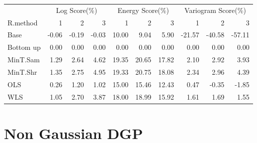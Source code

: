 \documentclass[]{article}
\begin{document}
\begin{table}[H]
\centering
\begin{tabular}{l|r|r|r|r|r|r|r|r|r}
\hline
\multicolumn{1}{c|}{ } & \multicolumn{3}{c|}{Log Score(\%)} & \multicolumn{3}{c|}{Energy Score(\%)} & \multicolumn{3}{c}{Variogram Score(\%)} \\
\cline{2-4} \cline{5-7} \cline{8-10}
R.method & 1 & 2 & 3 & 1 & 2 & 3 & 1 & 2 & 3\\
\hline
Base & -0.06 & -0.19 & -0.03 & 10.00 & 9.04 & 5.90 & -21.57 & -40.58 & -57.11\\
\hline
Bottom up & 0.00 & 0.00 & 0.00 & 0.00 & 0.00 & 0.00 & 0.00 & 0.00 & 0.00\\
\hline
MinT.Sam & 1.29 & 2.64 & 4.62 & 19.35 & 20.65 & 17.82 & 2.10 & 2.92 & 3.93\\
\hline
MinT.Shr & 1.35 & 2.75 & 4.95 & 19.33 & 20.75 & 18.08 & 2.34 & 2.96 & 4.39\\
\hline
OLS & 0.26 & 1.20 & 1.02 & 15.00 & 15.46 & 12.43 & 0.47 & -0.35 & -1.85\\
\hline
WLS & 1.05 & 2.70 & 3.87 & 18.00 & 18.99 & 15.92 & 1.61 & 1.69 & 1.55\\
\hline
\end{tabular}
\end{table}

\section{Non Gaussian DGP}\label{non-gaussian-dgp}
\end{document}

